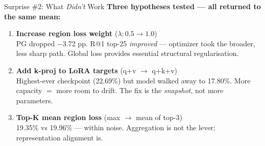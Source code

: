 \documentclass[aspectratio=169,12pt]{beamer}
\newcommand{\minus}[1]{{\color{negative}$-$#1}}
\begin{document}
\begin{frame}{Surprise \#2: What \emph{Didn't} Work}
  \textbf{Three hypotheses tested — all returned to the same mean:}

  \vspace{0.5em}
  \begin{enumerate}
    \item \textbf{Increase region loss weight} ($\lambda: 0.5 \to 1.0$)\\
          {\small PG dropped \minus{3.72 pp}. R@1 top-25 \emph{improved} — optimizer took the broader, less sharp path. Global loss provides essential structural regularisation.}

    \vspace{0.3em}
    \item \textbf{Add k-proj to LoRA targets} (q+v $\to$ q+k+v)\\
          {\small Highest-ever checkpoint (22.69\%) but model walked away to 17.80\%. More capacity $=$ more room to drift. The fix is the \emph{snapshot}, not more parameters.}

    \vspace{0.3em}
    \item \textbf{Top-K mean region loss} (max $\to$ mean of top-3)\\
          {\small 19.35\% vs 19.96\% — within noise. Aggregation is not the lever; representation alignment is.}
  \end{enumerate}
\end{frame}
\end{document}
